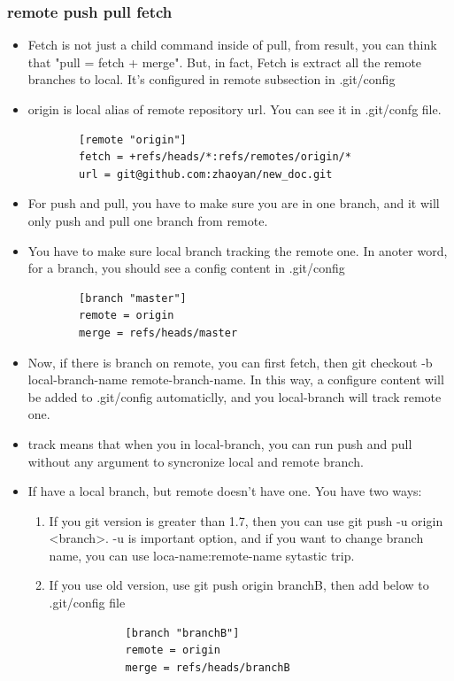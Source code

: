 \documentclass[a4paper,11pt,twoside]{book}
\begin{document}
\subsubsection{remote push pull fetch}
\begin{itemize}
	\item Fetch is not just a child command inside of pull, from result, you can think that "pull = fetch + merge". But, in fact, Fetch is extract all the remote branches to local. It's configured in remote subsection in .git/config
	
	\item origin is local alias of remote repository url. You can see it in .git/confg file.  
	
	\begin{verbatim}
		[remote "origin"]
		fetch = +refs/heads/*:refs/remotes/origin/*
		url = git@github.com:zhaoyan/new_doc.git
	\end{verbatim}
	
	\item For push and pull, you have to make sure you are in one branch, and it will only push and pull one branch from remote. 
	
	\item You have to make sure local branch tracking the remote one. In anoter word, for a branch, you should see a config content in .git/config
	\begin{verbatim}
		[branch "master"]
		remote = origin
		merge = refs/heads/master
	\end{verbatim}
	\item Now, if there is branch on remote, you can first fetch, then git checkout -b local-branch-name remote-branch-name. In this way, a configure content will be added to .git/config automaticlly, and you local-branch will track remote one.
	\item track means that when you in local-branch, you can run push and pull without any argument to syncronize local and remote branch.
	
	\item If have a local branch, but remote doesn't have one. You have two ways:
	\begin{enumerate}
		\item If you git version is greater than 1.7, then you can use git push -u origin <branch>. -u is important option, and if you want to change branch name, you can use loca-name:remote-name sytastic trip.
		\item If you use old version, use git push origin branchB, then add below to .git/config file
		\begin{verbatim}
			[branch "branchB"]
			remote = origin
			merge = refs/heads/branchB
		\end{verbatim}
	\end{enumerate}
	

\end{itemize}
\end{document}
